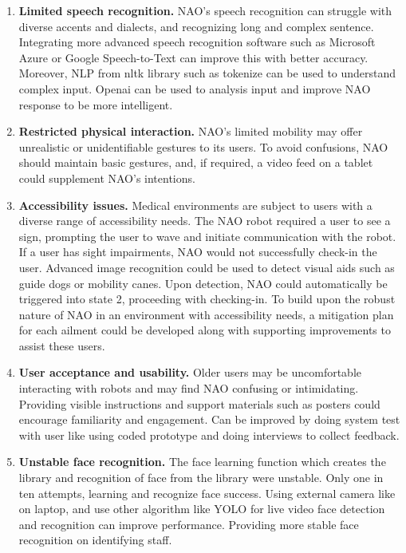 \documentclass[conference]{IEEEtran}
\begin{document}
\begin{enumerate} 
        \item \textbf{Limited speech recognition.} NAO’s speech recognition can struggle with diverse accents and dialects, and recognizing long and complex sentence. Integrating more advanced speech recognition software such as Microsoft Azure or Google Speech-to-Text can improve this with better accuracy. Moreover, NLP from nltk library such as tokenize can be used to understand complex input. Openai can be used to analysis input and improve NAO response to be more intelligent.
        \item \textbf{Restricted physical interaction.} NAO’s limited mobility may offer unrealistic or unidentifiable gestures to its users. To avoid confusions, NAO should maintain basic gestures, and, if required, a video feed on a tablet could supplement NAO’s intentions.
        \item \textbf{Accessibility issues.} Medical environments are subject to users with a diverse range of accessibility needs. The NAO robot required a user to see a sign, prompting the user to wave and initiate communication with the robot. If a user has sight impairments, NAO would not successfully check-in the user.  Advanced image recognition could be used to detect visual aids such as guide dogs or mobility canes. Upon detection, NAO could automatically be triggered into state 2, proceeding with checking-in. To build upon the robust nature of NAO in an environment with accessibility needs, a mitigation plan for each ailment could be developed along with supporting improvements to assist these users.
        \item \textbf{User acceptance and usability.} Older users may be uncomfortable interacting with robots and may find NAO confusing or intimidating. Providing visible instructions and support materials such as posters could encourage familiarity and engagement. Can be improved by doing system test with user like using coded prototype and doing interviews to collect feedback.
        \item \textbf{Unstable face recognition.} The face learning function which creates the library and recognition of face from the library were unstable. Only one in ten attempts, learning and recognize face success. Using external camera like on laptop, and use other algorithm like YOLO for live video face detection and recognition can improve performance. Providing more stable face recognition on identifying staff. 
\end{enumerate}
\end{document}
